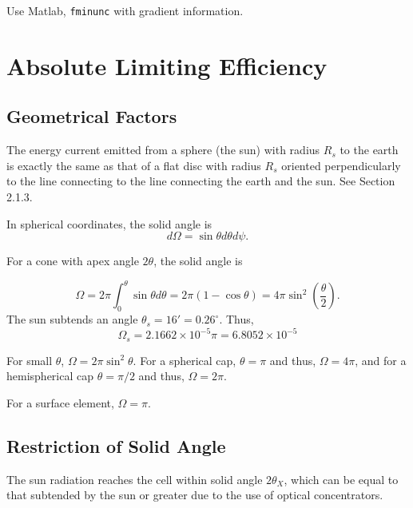 \documentclass[12pt]{article}
\begin{document}
Use Matlab, \texttt{fminunc} with gradient information.



\section{Absolute Limiting Efficiency}



\subsection{Geometrical Factors}
The energy current emitted from a sphere (the sun) with radius $R_s$ to the earth is exactly the same as that of a flat disc with radius $R_s$ oriented perpendicularly to the line connecting to the line connecting the earth and the sun.  See \cite{Wurfel:09} Section 2.1.3.

In spherical coordinates, the solid angle is 
\begin{equation}
\boxed{d \Omega = \sin \theta d \theta d \psi.}
\end{equation}

For a cone with apex angle $2 \theta$, the solid angle is 

\begin{equation}
\Omega = 2 \pi \int_0^{\theta} \sin \theta d \theta = 2 \pi (1 - \cos \theta) = 4 \pi \sin^2 (\frac{\theta}{2}).
\end{equation}
The sun subtends an angle $\theta_s = 16' = 0.26^{\circ}$. Thus, 
\begin{equation}
\boxed{\Omega_s = 2.1662 \times 10^{-5} \pi = 6.8052 \times 10^{-5}}
\end{equation}

For small $\theta$, $\Omega = 2 \pi \sin^2\theta$.  
For a spherical cap, $\theta = \pi$ and thus, $\Omega = 4 \pi$, and for a hemispherical cap $\theta = \pi/2$ and thus, $\Omega = 2 \pi$.  

For a surface element, $\Omega = \pi$.  





\subsection{Restriction of Solid Angle}
The sun radiation reaches the cell within solid angle $2 \theta_X$, which can be equal to that subtended by the sun or greater due to the use of optical concentrators.  
\end{document}

